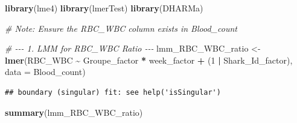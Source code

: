 \documentclass[
]{article}
\newenvironment{Shaded}{\begin{snugshade}}{\end{snugshade}}
\newcommand{\AttributeTok}[1]{\textcolor[rgb]{0.13,0.29,0.53}{#1}}
\newcommand{\CommentTok}[1]{\textcolor[rgb]{0.56,0.35,0.01}{\textit{#1}}}
\newcommand{\DecValTok}[1]{\textcolor[rgb]{0.00,0.00,0.81}{#1}}
\newcommand{\FunctionTok}[1]{\textcolor[rgb]{0.13,0.29,0.53}{\textbf{#1}}}
\newcommand{\NormalTok}[1]{#1}
\newcommand{\OtherTok}[1]{\textcolor[rgb]{0.56,0.35,0.01}{#1}}
\newcommand{\SpecialCharTok}[1]{\textcolor[rgb]{0.81,0.36,0.00}{\textbf{#1}}}
\begin{document}
\begin{Shaded}
\begin{Highlighting}[]
\FunctionTok{library}\NormalTok{(lme4)}
\FunctionTok{library}\NormalTok{(lmerTest) }
\FunctionTok{library}\NormalTok{(DHARMa)}

\CommentTok{\# Note: Ensure the RBC\_WBC column exists in Blood\_count}

\CommentTok{\# {-}{-}{-} 1. LMM for RBC\_WBC Ratio {-}{-}{-}}
\NormalTok{lmm\_RBC\_WBC\_ratio }\OtherTok{\textless{}{-}} \FunctionTok{lmer}\NormalTok{(RBC\_WBC }\SpecialCharTok{\textasciitilde{}}\NormalTok{ Groupe\_factor }\SpecialCharTok{*}\NormalTok{ week\_factor }\SpecialCharTok{+}\NormalTok{ (}\DecValTok{1} \SpecialCharTok{|}\NormalTok{ Shark\_Id\_factor),}
                         \AttributeTok{data =}\NormalTok{ Blood\_count)}
\end{Highlighting}
\end{Shaded}

\begin{verbatim}
## boundary (singular) fit: see help('isSingular')
\end{verbatim}

\begin{Shaded}
\begin{Highlighting}[]
\FunctionTok{summary}\NormalTok{(lmm\_RBC\_WBC\_ratio)}
\end{Highlighting}
\end{Shaded}
\end{document}
